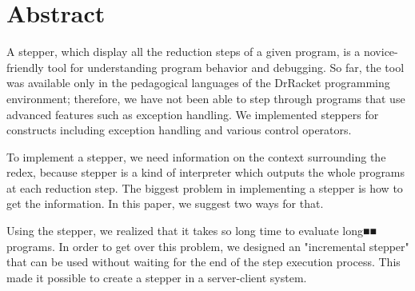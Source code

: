 \chapter*{Abstract}

A stepper, which display all the reduction steps of a given program,
is a novice-friendly tool for understanding program behavior and debugging.
So far, the tool was available only in
the pedagogical languages of the DrRacket programming environment;
therefore, we have not been able to step through programs that use advanced features
such as exception handling.
We implemented steppers for constructs including exception handling and
various control operators.

To implement a stepper, we need information on the context surrounding the redex,
because stepper is a kind of interpreter which outputs
the whole programs at each reduction step.
The biggest problem in implementing a stepper
is how to get the information.
In this paper, we suggest two ways for that.

Using the stepper,
we realized that it takes so long time to evaluate long■■ programs.
In order to get over this problem,
we designed an "incremental stepper" that can be used
without waiting for the end of the step execution process.
This made it possible to create a stepper in a server-client system.

